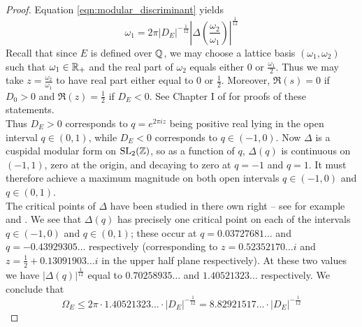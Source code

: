 \begin{proof}
Equation \ref{eqn:modular_discriminant} yields
\begin{equation}
\omega_1 = 2\pi |D_E|^{-\frac{1}{12}} \left| \Delta\left(\frac{\omega_2}{\omega_1}\right)\right|^{\frac{1}{12}}
\end{equation}
Recall that since $E$ is defined over $\mathbb{Q}$, we may choose a lattice basis $(\omega_1, \omega_2)$ such that $\omega_1 \in \mathbb{R}_{+}$ and the real part of $\omega_2$ equals either $0$ or $\frac{\omega_1}{2}$. Thus we may take $z = \frac{\omega_2}{\omega_1}$ to have real part either equal to 0 or $\frac{1}{2}$. Moreover, $\Re(s)=0$ if $D_0>0$ and $\Re(z)=\frac{1}{2}$ if $D_E<0$. See Chapter I of \cite{Sil-1994} for proofs of these statements. \\

Thus $D_E>0$ corresponds to $q = e^{2\pi i z}$ being positive real lying in the open interval $q \in (0,1)$, while $D_E<0$ corresponds to $q \in (-1,0)$. Now $\Delta$ is a cuspidal modular form on $\operatorname{SL}_2(\mathbb{Z})$, so as a function of $q$, $\Delta(q)$ is continuous on $(-1,1)$, zero at the origin, and decaying to zero at $q=-1$ and $q=1$. It must therefore achieve a maximum magnitude on both open intervals $q \in (-1,0)$ and $q \in (0,1)$. \\

The critical points of $\Delta$ have been studied in there own right -- see for example \cite{IJA-2013} and \cite{WoYo-2013}. We see that $\Delta(q)$ has precisely one critical point on each of the intervals $q \in (-1,0)$ and $q \in (0,1)$; these occur at $q = 0.03727681\ldots$ and $q =-0.43929305\ldots$ respectively (corresponding to $z=0.52352170\ldots i$ and $z=\frac{1}{2}+0.13091903\ldots i$ in the upper half plane respectively). At these two values we have $|\Delta(q)|^{\frac{1}{12}}$ equal to $0.70258935\ldots$ and $1.40521323\ldots$ respectively. We conclude that
\begin{equation}
\Omega_E \le 2\pi\cdot 1.40521323\ldots \cdot  |D_E|^{-\frac{1}{12}} = 8.82921517\ldots \cdot |D_E|^{-\frac{1}{12}}
\end{equation} 
\end{proof}

